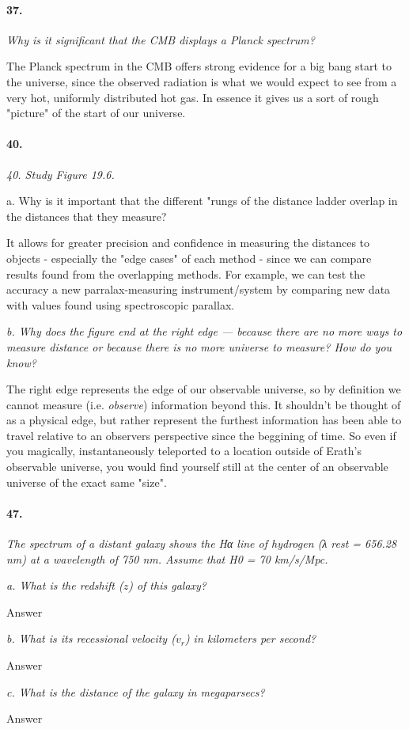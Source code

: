\documentclass[letterpaper,11pt]{article}
\begin{document}
\paragraph{37.}
\it
Why is it significant that the CMB displays a Planck spectrum?
\smallskip
	\par
	\normalfont
	The Planck spectrum in the CMB offers strong evidence for a big bang start to the universe, since the observed radiation is what we would expect to see from a very hot, uniformly distributed hot gas. In essence it gives us a sort of rough "picture" of the start of our universe.



\paragraph{40.}
\it
40. Study Figure 19.6.
\smallskip
\par
a. Why is it important that the different "rungs of the distance ladder overlap in the distances that they measure?
\smallskip
	\par
	\normalfont
	It allows for greater precision and confidence in measuring the distances to objects - especially the "edge cases" of each method - since we can compare results found from the overlapping methods. For example, we can test the accuracy a new parralax-measuring instrument/system by comparing new data with values found using spectroscopic parallax.
	\par
	\bigskip
\par
\it
b. Why does the figure end at the right edge — because there are no more ways to measure distance or because there is no more universe to measure? How do you know?
\smallskip
	\par
	\normalfont
	The right edge represents the edge of our observable universe, so by definition we cannot measure (i.e. \textit{observe}) information beyond this. It shouldn't be thought of as a physical edge, but rather represent the furthest information has been able to travel relative to an observers perspective since the beggining of time. So even if you magically, instantaneously teleported to a location outside of Erath's observable universe, you would find yourself still at the center of an observable universe of the exact same "size".

\paragraph{47.}
\it
The spectrum of a distant galaxy shows the Hα line of hydrogen (λ rest = 656.28 nm) at a wavelength of 750 nm. Assume that H0 = 70 km/s/Mpc.
\smallskip
\par
\it
a. What is the redshift ($z$) of this galaxy?
\smallskip
	\par
	\normalfont
	Answer
	\bigskip
\par
\it
b. What is its recessional velocity ($v_r$) in kilometers per second?
\smallskip
	\par
	\normalfont
	Answer
	\bigskip
\par
\it
c. What is the distance of the galaxy in megaparsecs?
\smallskip
	\par
	\normalfont
	Answer
\end{document}
